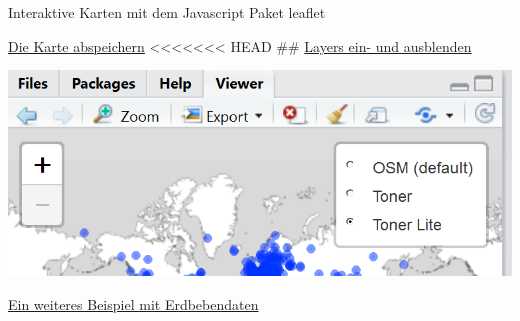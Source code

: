 \documentclass[ignorenonframetext,]{beamer}
\newenvironment{Shaded}{}{}
\newcommand{\KeywordTok}[1]{\textcolor[rgb]{0.00,0.44,0.13}{\textbf{{#1}}}}
\newcommand{\DataTypeTok}[1]{\textcolor[rgb]{0.56,0.13,0.00}{{#1}}}
\newcommand{\StringTok}[1]{\textcolor[rgb]{0.25,0.44,0.63}{{#1}}}
\newcommand{\OtherTok}[1]{\textcolor[rgb]{0.00,0.44,0.13}{{#1}}}
\newcommand{\NormalTok}[1]{{#1}}
\begin{document}
\begin{frame}[fragile]{Interaktive Karten mit dem Javascript Paket
leaflet}
\begin{block}{\href{http://www.r-bloggers.com/interactive-mapping-with-leaflet-in-r-2/}{Die
Karte abspeichern}}
\textless{}\textless{}\textless{}\textless{}\textless{}\textless{}\textless{}
HEAD \#\# \href{https://rstudio.github.io/leaflet/showhide.html}{Layers
ein- und ausblenden}

\begin{Shaded}
\end{Shaded}

\includegraphics{./tex2pdf.9796/d0d87c36714c088a0ea49e8dc94a92978feef5a7.png}

\end{block}

\begin{block}{\href{https://rstudio.github.io/leaflet/showhide.html}{Ein
weiteres Beispiel mit Erdbebendaten}}


\end{block}
\end{frame}
\end{document}
